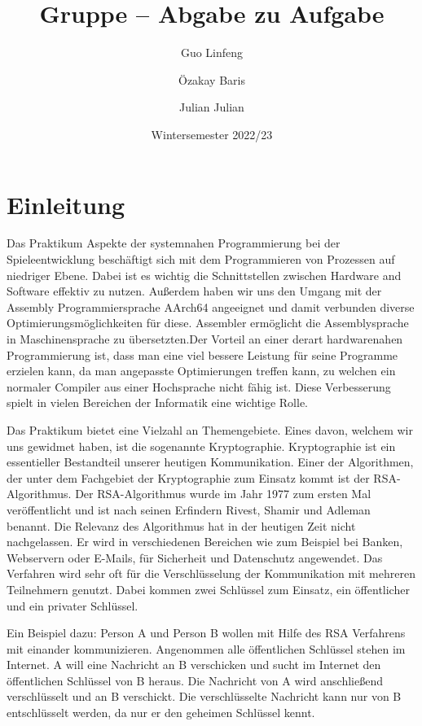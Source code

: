 \documentclass[course=asp]{aspdoc}
\author{Guo Linfeng \and Özakay Baris \and Julian Julian}
\date{Wintersemester 2022/23} %
\title{Gruppe \theGroup{} -- Abgabe zu Aufgabe \theNumber}
\begin{document}
\maketitle

\section{Einleitung}
Das Praktikum Aspekte der systemnahen Programmierung bei der Spieleentwicklung beschäftigt sich mit dem Programmieren von Prozessen auf niedriger Ebene. Dabei ist es wichtig die Schnittstellen zwischen Hardware and Software effektiv zu nutzen. Außerdem haben wir uns den Umgang mit der Assembly Programmiersprache AArch64 angeeignet und damit verbunden diverse Optimierungsmöglichkeiten für diese. Assembler ermöglicht die Assemblysprache in Maschinensprache zu übersetzten.Der Vorteil an einer derart hardwarenahen Programmierung ist, dass man eine viel bessere Leistung für seine Programme erzielen kann, da man angepasste Optimierungen treffen kann, zu welchen ein normaler Compiler aus einer Hochsprache nicht fähig ist. Diese Verbesserung spielt in vielen Bereichen der Informatik eine wichtige Rolle.

Das Praktikum bietet eine Vielzahl an Themengebiete. Eines davon, welchem wir uns gewidmet haben, ist die sogenannte Kryptographie. Kryptographie ist ein essentieller Bestandteil unserer heutigen Kommunikation. Einer der Algorithmen, der unter dem Fachgebiet der Kryptographie zum Einsatz kommt ist der RSA-Algorithmus. Der RSA-Algorithmus wurde im Jahr 1977 zum ersten Mal veröffentlicht und ist nach seinen Erfindern Rivest, Shamir und Adleman benannt. Die Relevanz des Algorithmus hat in der heutigen Zeit nicht nachgelassen. Er wird in verschiedenen Bereichen wie zum Beispiel bei Banken, Webservern oder E-Mails, für Sicherheit und Datenschutz angewendet. Das Verfahren wird sehr oft für die Verschlüsselung der Kommunikation mit mehreren Teilnehmern genutzt. Dabei kommen zwei Schlüssel zum Einsatz, ein öffentlicher und ein privater Schlüssel. \cite{TTheRSAAlgorithm}

Ein Beispiel dazu: Person A und Person B wollen mit Hilfe des RSA Verfahrens mit einander kommunizieren. Angenommen alle öffentlichen Schlüssel stehen im Internet. A will eine Nachricht an B verschicken und sucht im Internet den öffentlichen Schlüssel von B heraus. Die Nachricht von A wird anschließend verschlüsselt und an B verschickt. Die verschlüsselte Nachricht kann nur von B entschlüsselt werden, da nur er den geheimen Schlüssel kennt. 
 
\end{document}

